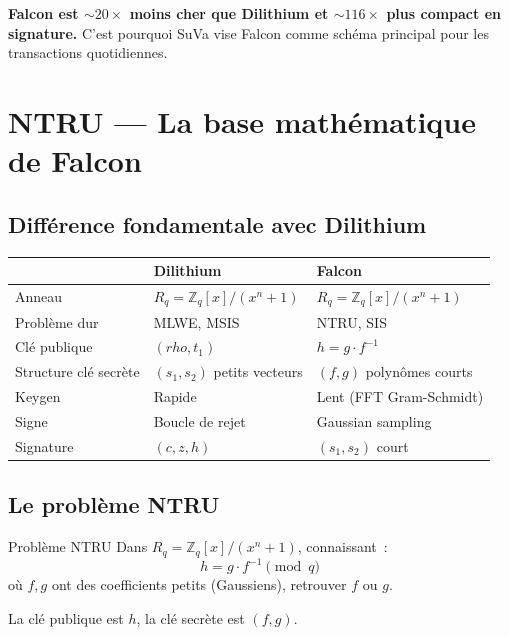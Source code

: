 \documentclass[12pt, a4paper]{article}
\begin{document}
\textbf{Falcon est $\sim 20\times$ moins cher que Dilithium et $\sim 116\times$
plus compact en signature.} C'est pourquoi SuVa vise Falcon comme schéma
principal pour les transactions quotidiennes.

\section{NTRU --- La base mathématique de Falcon}

\subsection{Différence fondamentale avec Dilithium}

\begin{compbox}
\begin{center}
\begin{tabular}{lll}
\toprule
& \textbf{Dilithium} & \textbf{Falcon} \\
\midrule
Anneau & $R_q = \mathbb{Z}_q[x]/(x^n+1)$ & $R_q = \mathbb{Z}_q[x]/(x^n+1)$ \\
Problème dur & MLWE, MSIS & NTRU, SIS \\
Clé publique & $(rho, t_1)$ & $h = g \cdot f^{-1}$ \\
Structure clé secrète & $(s_1, s_2)$ petits vecteurs & $(f, g)$ polynômes courts \\
Keygen & Rapide & Lent (FFT Gram-Schmidt) \\
Signe & Boucle de rejet & Gaussian sampling \\
Signature & $(c, z, h)$ & $(s_1, s_2)$ court \\
\bottomrule
\end{tabular}
\end{center}
\end{compbox}

\subsection{Le problème NTRU}

\begin{defbox}{Problème NTRU}
Dans $R_q = \mathbb{Z}_q[x]/(x^n + 1)$, connaissant~:
$$h = g \cdot f^{-1} \pmod{q}$$
où $f, g$ ont des coefficients petits (Gaussiens), retrouver $f$ ou $g$.

La clé publique est $h$, la clé secrète est $(f, g)$.
\end{defbox}
\end{document}
